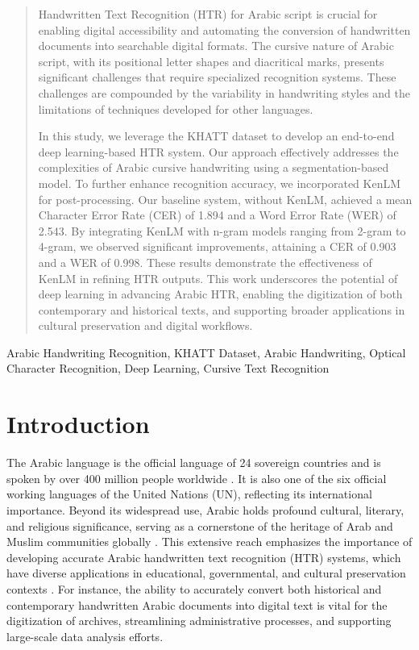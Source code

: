 \documentclass[conference]{IEEEtran}
\begin{document}
\begin{abstract}
Handwritten Text Recognition (HTR) for Arabic script is crucial for enabling digital accessibility and automating the conversion of handwritten documents into searchable digital formats. The cursive nature of Arabic script, with its positional letter shapes and diacritical marks, presents significant challenges that require specialized recognition systems. These challenges are compounded by the variability in handwriting styles and the limitations of techniques developed for other languages.

In this study, we leverage the KHATT dataset to develop an end-to-end deep learning-based HTR system. Our approach effectively addresses the complexities of Arabic cursive handwriting using a segmentation-based model. To further enhance recognition accuracy, we incorporated KenLM for post-processing. Our baseline system, without KenLM, achieved a mean Character Error Rate (CER) of 1.894 and a Word Error Rate (WER) of 2.543. By integrating KenLM with n-gram models ranging from 2-gram to 4-gram, we observed significant improvements, attaining a CER of 0.903 and a WER of 0.998. These results demonstrate the effectiveness of KenLM in refining HTR outputs. This work underscores the potential of deep learning in advancing Arabic HTR, enabling the digitization of both contemporary and historical texts, and supporting broader applications in cultural preservation and digital workflows.

\end{abstract}


\begin{IEEEkeywords}
Arabic Handwriting Recognition, KHATT Dataset, Arabic Handwriting, Optical Character Recognition, Deep Learning, Cursive Text Recognition
\end{IEEEkeywords}

\section{Introduction}

The Arabic language is the official language of 24 sovereign countries and is spoken by over 400 million people worldwide \cite{saeed2024muharaf}. It is also one of the six official working languages of the United Nations (UN), reflecting its international importance. Beyond its widespread use, Arabic holds profound cultural, literary, and religious significance, serving as a cornerstone of the heritage of Arab and Muslim communities globally \cite{ayuba2013}. This extensive reach emphasizes the importance of developing accurate Arabic handwritten text recognition (HTR) systems, which have diverse applications in educational, governmental, and cultural preservation contexts \cite{mutawa2024machine}. For instance, the ability to accurately convert both historical and contemporary handwritten Arabic documents into digital text is vital for the digitization of archives, streamlining administrative processes, and supporting large-scale data analysis efforts.
\end{document}
